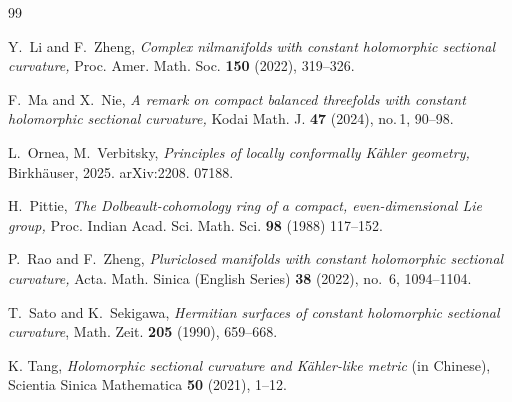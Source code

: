 \documentclass{amsart}
\numberwithin{equation}{section}
\begin{document}
\begin{thebibliography}{99}






 Y.~Li and F.~Zheng, \emph{Complex nilmanifolds with constant holomorphic sectional curvature,}  Proc. Amer. Math. Soc. {\bf 150} (2022), 319--326.

 F.~Ma and X.~Nie, \emph{A remark on compact balanced threefolds with constant holomorphic sectional curvature,} Kodai Math. J. {\bf 47} (2024), no.\,1, 90--98.



 L.~Ornea, M.~Verbitsky, \emph{Principles of locally conformally K\"ahler geometry,} Birkh\"auser, 2025. arXiv:2208. 07188.



 H.~Pittie, \emph{The Dolbeault-cohomology ring of a compact, even-dimensional Lie group,} Proc. Indian Acad. Sci. Math. Sci. {\bf 98} (1988) 117--152.


 P.~Rao and F.~Zheng, \emph{ Pluriclosed manifolds with constant holomorphic sectional curvature,} Acta. Math. Sinica (English Series) {\bf 38} (2022), no.~6, 1094--1104.


 T.~Sato and K.~Sekigawa, \emph{Hermitian surfaces of constant holomorphic sectional curvature}, Math. Zeit. \textbf{205} (1990), 659--668.



 K. Tang, \emph{Holomorphic sectional curvature and K\"ahler-like metric} (in Chinese),  Scientia Sinica Mathematica {\bf 50} (2021), 1--12.





\end{thebibliography}
\end{document}
